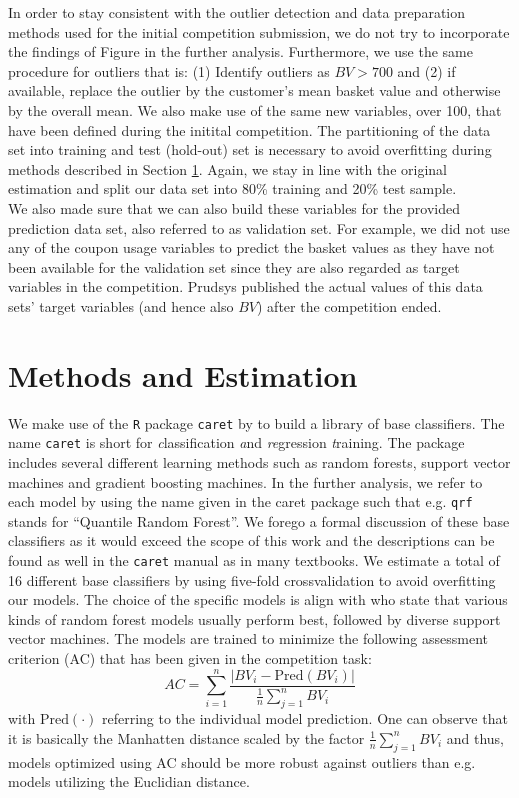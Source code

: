 \documentclass[12pt]{article}
\begin{document}
In order to stay consistent with the outlier detection and data preparation methods used for the initial competition submission, we do not try to incorporate the findings of Figure \label{ref:histbv} in the further analysis. Furthermore, we use the same procedure for outliers that is: (1) Identify outliers as $BV > 700$ and (2) if available, replace the outlier by the customer's mean basket value and otherwise by the overall mean.
We also make use of the same new variables, over 100, that have been defined during the initital competition.
The partitioning of the data set into training and test (hold-out) set is necessary to avoid overfitting during methods described in Section \ref{sect:meth}. Again, we stay in line with the original estimation and split our data set into 80\% training and 20\% test sample.\\

We also made sure that we can also build these variables for the provided prediction data set, also referred to as validation set. For example, we did not use any of the coupon usage variables to predict the basket values as they have not been available for the validation set since they are also regarded as target variables in the competition.
Prudsys published the actual values of this data sets' target variables (and hence also $BV$) after the competition ended.  

\section{Methods and Estimation}
\label{sect:meth}
We make use of the \texttt{R} package \texttt{caret} by \cite{caret} to build a library of base classifiers. The name \texttt{caret} is short for \textit{c}lassification \textit{a}nd \textit{re}gression \textit{t}raining. The package includes several different learning methods such as random forests, support vector machines and gradient boosting machines. In the further analysis, we refer to each model by using the name given in the caret package such that e.g. \texttt{qrf} stands for ``Quantile Random Forest''. 
We forego a formal discussion of these base classifiers as it would exceed the scope of this work and the descriptions can be found as well in the \texttt{caret} manual as in many textbooks. We estimate a total of 16 different base classifiers by using five-fold crossvalidation to avoid overfitting our models.
The choice of the specific models is align with \cite{Fernandez-Delgado2014} who state that various kinds of random forest models usually perform best, followed by diverse support vector machines.
The models are trained to minimize the following assessment criterion (AC) that has been given in the competition task:
\begin{equation}
AC = \sum_{i=1}^n \frac{|BV_{i} - \mbox{Pred}(BV_{i})|}{\frac{1}{n} \sum_{j=1}^n BV_{i}}
\end{equation}
with $\mbox{Pred}(\cdot)$ referring to the individual model prediction. One can observe that it is basically the Manhatten distance scaled by the factor  $\frac{1}{n} \sum_{j=1}^n BV_{i}$ and thus, models optimized using AC should be more robust against outliers than e.g. models utilizing the Euclidian distance. \\
\end{document}
